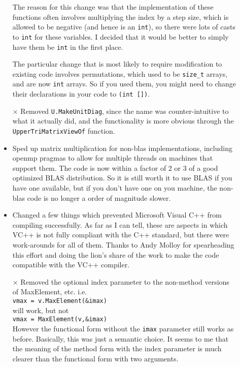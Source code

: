\documentclass[twoside,letterpaper,11pt]{article}
\renewcommand{\tt}[1]{{\texttt {#1}}}
\begin{document}
\begin{description}
\begin{itemize}
The reason for this change
was that the implementation of these
functions often involves multiplying the index
by a step size, which is allowed to be negative (and hence
is an \tt{int}), so there were lots of casts to \tt{int} for these variables.  
I decided that it would be better to simply have them be \tt{int} in the first place.

The particular change that is most likely to require modification to existing code
involves permutations, which used to be \tt{size\_t} arrays, and are now
\tt{int} arrays.  So if you used them, you might need to change their 
declarations in your code to \tt{(int [])}.
\item[$\times$]
Removed \tt{U.MakeUnitDiag}, since the name was counter-intuitive to what it 
actually did, and the functionality is more obvious through the 
\tt{UpperTriMatrixViewOf} function.
\item
Sped up matrix multiplication for non-blas implementations, including
openmp pragmas to allow for multiple threads on machines that support them.
The code is now within a factor of 2 or 3 of a good optimized BLAS 
distribution.  So it is still worth it to use BLAS if you have one available,
but if you don't have one on you machine, the non-blas code is no longer a
order of magnitude slower.
\item
Changed a few things which prevented Microsoft Visual C++ from compiling successfully.  
As far as I can tell, these are aspects in which VC++ is not fully compliant with the C++ 
standard, but there were work-arounds for all of them.
Thanks to Andy Molloy
for spearheading this effort and doing the lion's share of the work to make
the code compatible with the VC++ compiler.
\item[$\times$]
Removed the optional index parameter to the non-method versions of 
MaxElement, etc.   i.e.\\
\tt{vmax = v.MaxElement(\&imax)}\\
will work, but not\\
\tt{vmax = MaxElement(v,\&imax)}\\
However the functional form without the \tt{imax} parameter still works as before.
Basically, this was just a semantic choice.  It seems to me that the meaning of the method
form with the index parameter is much clearer than the functional form with two arguments.


\end{itemize}
\end{description}
\end{document}
